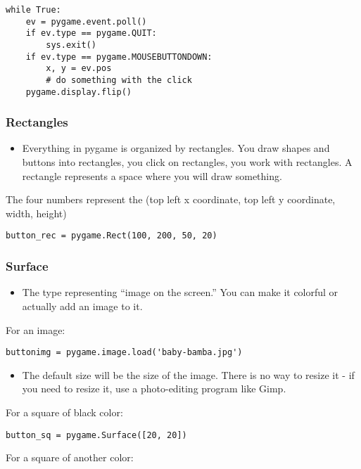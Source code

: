\documentclass[letterpaper,10pt,english]{/usr/local/lib/python2.7/dist-packages/sphinx/texinputs/sphinxhowto}
\begin{document}
\begin{verbatim}
while True: 
    ev = pygame.event.poll()
    if ev.type == pygame.QUIT: 
        sys.exit()
    if ev.type == pygame.MOUSEBUTTONDOWN: 
        x, y = ev.pos
        # do something with the click
    pygame.display.flip()
\end{verbatim}\subsubsection{Rectangles}\begin{itemize}
\item
  Everything in pygame is organized by rectangles. You draw shapes and
  buttons into rectangles, you click on rectangles, you work with
  rectangles. A rectangle represents a space where you will draw
  something.
\end{itemize}The four numbers represent the (top left x coordinate, top left y
coordinate, width, height)

\begin{verbatim}
button_rec = pygame.Rect(100, 200, 50, 20)
\end{verbatim}\subsubsection{Surface}\begin{itemize}
\item
  The type representing ``image on the screen.'' You can make it
  colorful or actually add an image to it.
\end{itemize}For an image:

\begin{verbatim}
buttonimg = pygame.image.load('baby-bamba.jpg')
\end{verbatim}\begin{itemize}
\item
  The default size will be the size of the image. There is no way to
  resize it - if you need to resize it, use a photo-editing program like
  Gimp.
\end{itemize}For a square of black color:

\begin{verbatim}
button_sq = pygame.Surface([20, 20])
\end{verbatim}
For a square of another color:
\end{document}
